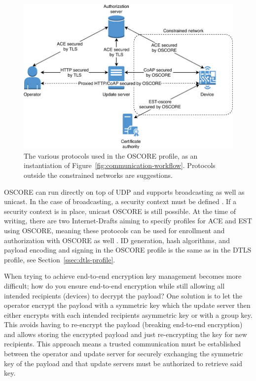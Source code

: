 \documentclass[0-thesis.tex]{subfiles}
\begin{document}
\begin{figure}[t]
    \caption[The various protocols used in the OSCORE profile.]
        {The various protocols used in the OSCORE profile, as an instantiation of
            Figure~\ref{fig:communication-workflow}. Protocols outside the constrained networks are suggestions.}
    \label{fig:oscore-profile}
    \includegraphics{images/oscore-profile.pdf}
\end{figure}

OSCORE can run directly on top of UDP and supports broadcasting as well as unicast. In the
case of broadcasting, a security context must be defined \parencite{oscore-group}. If a
security context is in place, unicast OSCORE is still possible. At the time of writing,
there are two Internet-Drafts aiming to specify profiles for ACE and EST using OSCORE,
meaning these protocols can be used for enrollment and authorization with OSCORE as well
\parencite{ace-oscore, est-oscore}. ID generation, hash algorithms, and payload encoding
and signing in the OSCORE profile is the same as in the DTLS profile, see
Section~\ref{ssec:dtls-profile}.

When trying to achieve end-to-end encryption key management becomes more difficult; how do
you ensure end-to-end encryption while still allowing all intended recipients (devices) to
decrypt the payload? One solution is to let the operator encrypt the payload with a
symmetric key which the update server then either encrypts with each intended recipients
asymmetric key or with a group key. This avoids having to re-encrypt the payload (breaking
end-to-end encryption) and allows storing the encrypted payload and just re-encrypting the
key for new recipients. This approach means a trusted communication must be established
between the operator and update server for securely exchanging the symmetric key of the
payload and that update servers must be authorized to retrieve said key.
\end{document}
